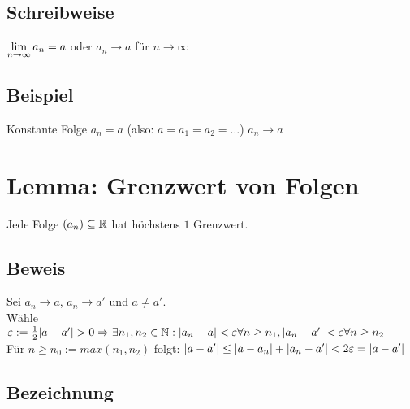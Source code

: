 \subsection*{Schreibweise}
$\displaystyle\lim_{n \to \infty} a_n = a$ oder $a_n \to a$ für $n \to \infty$

\subsection*{Beispiel}
Konstante Folge $a_n = a$ (also: $a = a_1 = a_2 = \hdots$) $a_n \to a$

\section{Lemma: Grenzwert von Folgen}\label{5.3}
Jede Folge $(a_n) \subseteq \mathbb{R}$ hat höchstens $1$ Grenzwert.

\subsection*{Beweis}
Sei $a_n \to a$, $a_n \to a'$ und $a \neq a'$.\\
Wähle $\varepsilon := \frac{1}{2} |a-a'| > 0 \Rightarrow \exists n_1 , n_2 \in \mathbb{N} : |a_n - a| < \varepsilon \forall n \ge n_1 , |a_n - a'| < \varepsilon \forall n \ge n_2$\\
Für $n \ge n_0 := max(n_1 , n_2)$ folgt: $|a-a'| \le |a-a_n| + |a_n-a'| < 2 \varepsilon = |a-a'|$ \wspruch

\subsection*{Bezeichnung}


